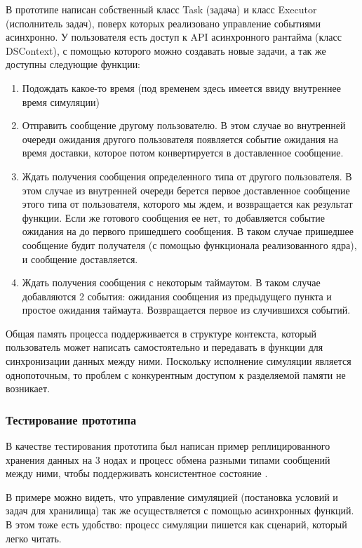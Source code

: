 В прототипе написан собственный класс Task (задача) и класс Executor (исполнитель задач), поверх которых реализовано управление событиями асинхронно. У пользователя есть доступ к API асинхронного рантайма (класс DSContext), с помощью которого можно создавать новые задачи, а так же доступны следующие функции:
\begin{enumerate}
    \item Подождать какое-то время (под временем здесь имеется ввиду внутреннее время симуляции)
    \item Отправить сообщение другому пользователю. В этом случае во внутренней очереди ожидания другого пользователя появляется событие ожидания на время доставки, которое потом конвертируется в доставленное сообщение.
    \item Ждать получения сообщения определенного типа от другого пользователя. В этом случае из внутренней очереди берется первое доставленное сообщение этого типа от пользователя, которого мы ждем, и возвращается как результат функции. Если же готового сообщения ее нет, то добавляется событие ожидания на до первого пришедшего сообщения. В таком случае пришедшее сообщение будит получателя (с помощью функционала реализованного ядра), и сообщение доставляется. 
    \item Ждать получения сообщения с некоторым таймаутом. В таком случае добавляются 2 события: ожидания сообщения из предыдущего пункта и простое ожидания таймаута. Возвращается первое из случившихся событий.
\end{enumerate}

Общая память процесса поддерживается в структуре контекста, который пользователь может написать самостоятельно и передавать в функции для синхронизации данных между ними. Поскольку исполнение симуляции является однопоточным, то проблем с конкурентным доступом к разделяемой памяти не возникает. 

\subsubsection{Тестирование прототипа}

В качестве тестирования прототипа был написан пример реплицированного хранения данных на 3 нодах и процесс обмена разными типами сообщений между ними, чтобы поддерживать консистентное состояние \cite{my-demo-replicas}. 

В примере можно видеть, что управление симуляцией (постановка условий и задач для хранилища) так же осуществляется с помощью асинхронных функций. В этом тоже есть удобство: процесс симуляции пишется как сценарий, который легко читать. 

